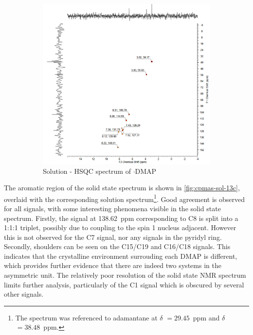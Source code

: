 \begin{refsection}
\begin{figure}
    \begin{subfigure}[t]{\linewidth}
    \centering
    \includegraphics[width=0.75\linewidth]{Figures/ebs-4ome-dmap-sol-hsqc.pdf}
    \caption{Solution - HSQC spectrum of $\cdot$DMAP}
    \label{fig:ebs-4ome-dmap-sol-hsqc}
    \end{subfigure}
    \caption[Solution NMR spectra of \texorpdfstring{$\cdot$}{.}DMAP.]{}
    \label{fig:ebs-4ome-dmap-sol}
\end{figure}

The aromatic region of the solid state  spectrum is shown in \cref{fig:cpmas-sol-13c}, overlaid with the corresponding solution spectrum\footnote{The  spectrum was referenced to adamantane at $\delta$ $= 29.45$~ppm and $\delta$ $= 38.48$~ppm.\autocite{Morcombe2003}}.
Good agreement is observed for all signals, with some interesting phenomena visible in the solid state spectrum.
Firstly, the signal at 138.62~ppm corresponding to C8 is split into a 1:1:1 triplet, possibly due to coupling to the spin 1  nucleus adjacent.
However this is not observed for the C7 signal, nor any signals in the pyridyl ring.
Secondly, shoulders can be seen on the C15/C19 and C16/C18 signals.
This indicates that the crystalline environment surrouding each DMAP is different, which provides further evidence that there are indeed two systems in the asymmetric unit.
The relatively poor resolution of the solid state  NMR spectrum limits further analysis, particularly of the C1 signal which is obscured by several other signals.


\end{refsection}
